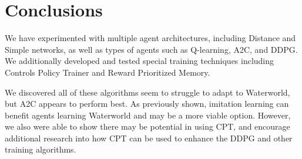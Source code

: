 \section{Conclusions}\label{sec:conclusions}
We have experimented with multiple agent architectures, including Distance and Simple
networks, as well as types of agents such as Q-learning, A2C, and DDPG\@.
We additionally developed and tested special training techniques including Controls
Policy Trainer and Reward Prioritized Memory.

We discovered all of these algorithms seem to struggle to adapt to Waterworld, but
A2C appears to perform best.
As previously shown, imitation learning can benefit agents learning Waterworld and
may be a more viable option.
However, we also were able to show there may be potential in using CPT, and encourage
additional research into how CPT can be used to enhance the DDPG and other training
algorithms.
